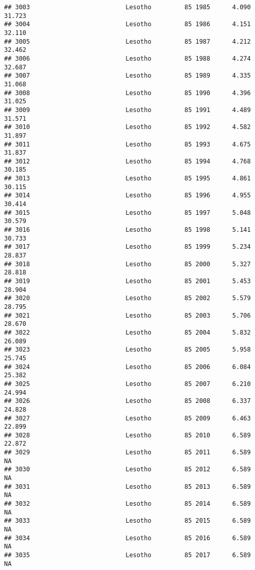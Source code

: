\documentclass[
]{article}
\begin{document}
\begin{verbatim}
## 3003                          Lesotho         85 1985      4.090     31.723
## 3004                          Lesotho         85 1986      4.151     32.110
## 3005                          Lesotho         85 1987      4.212     32.462
## 3006                          Lesotho         85 1988      4.274     32.687
## 3007                          Lesotho         85 1989      4.335     31.068
## 3008                          Lesotho         85 1990      4.396     31.025
## 3009                          Lesotho         85 1991      4.489     31.571
## 3010                          Lesotho         85 1992      4.582     31.897
## 3011                          Lesotho         85 1993      4.675     31.837
## 3012                          Lesotho         85 1994      4.768     30.185
## 3013                          Lesotho         85 1995      4.861     30.115
## 3014                          Lesotho         85 1996      4.955     30.414
## 3015                          Lesotho         85 1997      5.048     30.579
## 3016                          Lesotho         85 1998      5.141     30.733
## 3017                          Lesotho         85 1999      5.234     28.837
## 3018                          Lesotho         85 2000      5.327     28.818
## 3019                          Lesotho         85 2001      5.453     28.904
## 3020                          Lesotho         85 2002      5.579     28.795
## 3021                          Lesotho         85 2003      5.706     28.670
## 3022                          Lesotho         85 2004      5.832     26.089
## 3023                          Lesotho         85 2005      5.958     25.745
## 3024                          Lesotho         85 2006      6.084     25.382
## 3025                          Lesotho         85 2007      6.210     24.994
## 3026                          Lesotho         85 2008      6.337     24.828
## 3027                          Lesotho         85 2009      6.463     22.899
## 3028                          Lesotho         85 2010      6.589     22.872
## 3029                          Lesotho         85 2011      6.589         NA
## 3030                          Lesotho         85 2012      6.589         NA
## 3031                          Lesotho         85 2013      6.589         NA
## 3032                          Lesotho         85 2014      6.589         NA
## 3033                          Lesotho         85 2015      6.589         NA
## 3034                          Lesotho         85 2016      6.589         NA
## 3035                          Lesotho         85 2017      6.589         NA

\end{verbatim}
\end{document}
